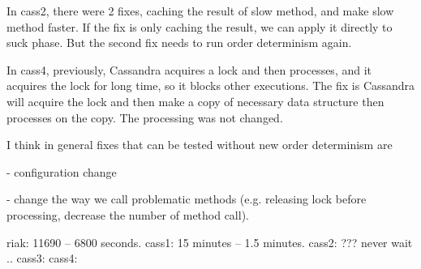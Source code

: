 In cass2, there were 2 fixes, caching the result of slow method, and make
slow method faster.  If the fix is only caching the result, we can apply
it directly to suck phase.  But the second fix needs to run order
determinism again.

In cass4, previously, Cassandra acquires a lock and then processes, and it
acquires the lock for long time, so it blocks other executions.  The fix
is Cassandra will acquire the lock and then make a copy of necessary data
structure then processes on the copy. The processing was not changed.

I think in general fixes that can be tested without new order determinism are

- configuration change

- change the way we call problematic methods (e.g. releasing lock before
processing, decrease the number of method call).


\fi

riak: 11690 -- 6800 seconds.
cass1: 15 minutes -- 1.5 minutes.
cass2: ??? never wait .. 
cass3: 
cass4: 
\fi

